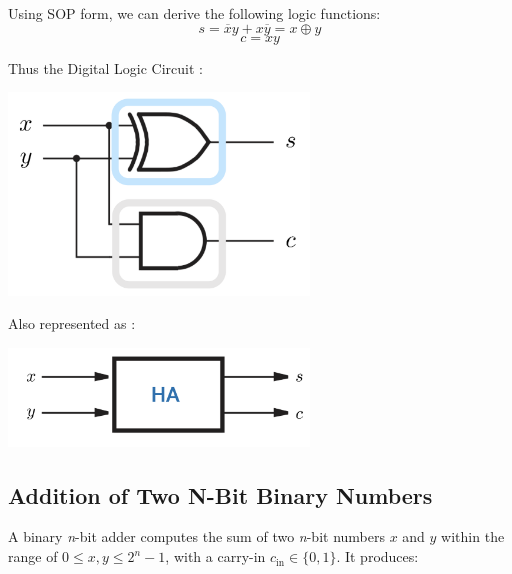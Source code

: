 \documentclass[12pt,openany, tikz,border=10pt]{book}
\newcommand*\xor{\oplus}
\begin{document}
			      	Using SOP form, we can derive the following logic functions:
			      	$$ s = \overline{x}y + x\overline{y} = x \xor y$$
			      	$$ c = xy$$
			      	
			      	Thus the Digital Logic Circuit : 
			      	\begin{center}
			      		\begin{minipage}[c]{0.60\textwidth} %
			      			\centering
			      			\includegraphics[width=0.60\textwidth]{circuits/7.1.3.png} %
			      		\end{minipage}
			      		
			      	\end{center}
			      	Also represented as :
			      	\begin{center}
			      		\begin{minipage}[c]{0.60\textwidth} %
			      			\centering
			      			\includegraphics[width=0.60\textwidth]{circuits/7.1.3_2.png} %
			      		\end{minipage}
			      		
			      	\end{center}
			      	\newpage
			      	
			      	\subsection{Addition of Two N-Bit Binary Numbers}
			      	A binary \textit{n}-bit adder computes the sum of two \textit{n}-bit numbers $x$ and $y$ within the range of $0 \leq x, y \leq 2^n - 1$, with a carry-in $c_{\text{in}} \in \{0, 1\}$. It produces:
			      	
\end{document}

